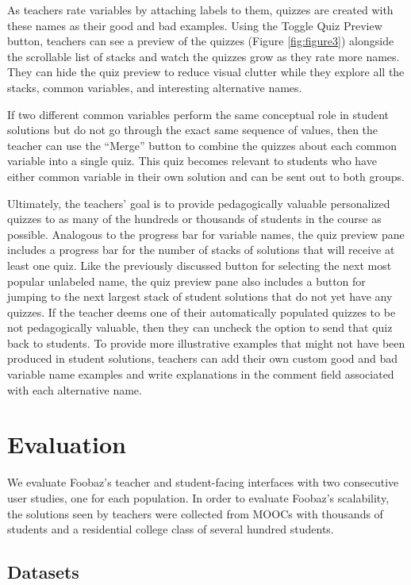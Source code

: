 As teachers rate variables by attaching labels to them, quizzes are created with these names as their good and bad examples. Using the Toggle Quiz Preview button, teachers can see a preview of the quizzes (Figure \ref{fig:figure3}) alongside the scrollable list of stacks and watch the quizzes grow as they rate more names. They can hide the quiz preview to reduce visual clutter while they explore all the stacks, common variables, and interesting alternative names.

If two different common variables perform the same conceptual role in student solutions but do not go through the exact same sequence of values, then the teacher can use the ``Merge'' button to combine the quizzes about each common variable into a single quiz. This quiz becomes relevant to students who have either common variable in their own solution and can be sent out to both groups.

Ultimately, the teachers' goal is to provide pedagogically valuable personalized quizzes to as many of the hundreds or thousands of students in the course as possible. Analogous to the progress bar for variable names, the quiz preview pane includes a progress bar for the number of stacks of solutions that will receive at least one quiz. Like the previously discussed button for selecting the next most popular unlabeled name, the quiz preview pane also includes a button for jumping to the next largest stack of student solutions that do not yet have any quizzes. If the teacher deems one of their automatically populated quizzes to be not pedagogically valuable, then they can uncheck the option to send that quiz back to students. To provide more illustrative examples that might not have been produced in student solutions, teachers can add their own custom good and bad variable name examples and write explanations in the comment field associated with each alternative name.

\section{Evaluation}

We evaluate Foobaz's teacher and student-facing interfaces with two consecutive user studies, one for each population. In order to evaluate Foobaz's scalability, the solutions seen by teachers were collected from MOOCs with thousands of students and a residential college class of several hundred students.

\subsection{Datasets}

